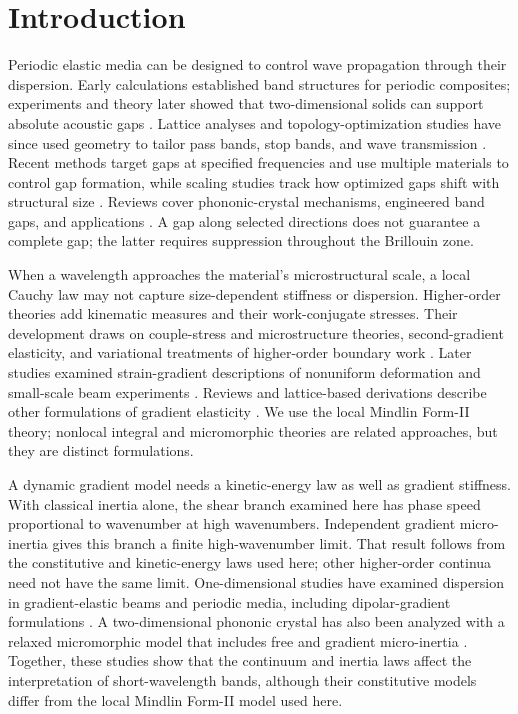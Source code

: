 \section{Introduction}
\label{sec:intro}

Periodic elastic media can be designed to control wave propagation through their dispersion. Early calculations established band structures for periodic composites; experiments and theory later showed that two-dimensional solids can support absolute acoustic gaps \cite{SigalasEconomou1992,kushwaha1993,vasseur2001}. Lattice analyses and topology-optimization studies have since used geometry to tailor pass bands, stop bands, and wave transmission \cite{MartinssonMovchan2003,SigmundJensen2003,Dalklint2022}. Recent methods target gaps at specified frequencies and use multiple materials to control gap formation, while scaling studies track how optimized gaps shift with structural size \cite{He2026,Nakayama2025,Quinteros2026}. Reviews cover phononic-crystal mechanisms, engineered band gaps, and applications \cite{Vasileiadis2021,Oudich2023,MaWangYuan2026}. A gap along selected directions does not guarantee a complete gap; the latter requires suppression throughout the Brillouin zone.

When a wavelength approaches the material's microstructural scale, a local Cauchy law may not capture size-dependent stiffness or dispersion. Higher-order theories add kinematic measures and their work-conjugate stresses. Their development draws on couple-stress and microstructure theories, second-gradient elasticity, and variational treatments of higher-order boundary work \cite{toupin1962,MindlinTiersten1962,mindlin1964,Mindlin1965,mindlineshel1968,Germain1973}. Later studies examined strain-gradient descriptions of nonuniform deformation and small-scale beam experiments \cite{Aifantis1999,YangChongLamTong2002,LamYangChongWangTong2003}. Reviews and lattice-based derivations describe other formulations of gradient elasticity \cite{askesaifantis2011,polyzosfotiadis2012}. We use the local Mindlin Form-II theory; nonlocal integral and micromorphic theories are related approaches, but they are distinct formulations.

A dynamic gradient model needs a kinetic-energy law as well as gradient stiffness. With classical inertia alone, the shear branch examined here has phase speed proportional to wavenumber at high wavenumbers. Independent gradient micro-inertia gives this branch a finite high-wavenumber limit. That result follows from the constitutive and kinetic-energy laws used here; other higher-order continua need not have the same limit. One-dimensional studies have examined dispersion in gradient-elastic beams and periodic media, including dipolar-gradient formulations \cite{papargyribeskou2009,liweizhou2016,HosseiniSladekSladekZhang2024}. A two-dimensional phononic crystal has also been analyzed with a relaxed micromorphic model that includes free and gradient micro-inertia \cite{MadeoColletMiniaciBillonOuisseNeff2018}. Together, these studies show that the continuum and inertia laws affect the interpretation of short-wavelength bands, although their constitutive models differ from the local Mindlin Form-II model used here.

